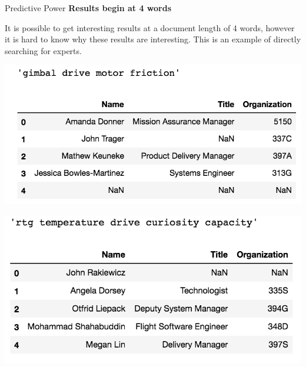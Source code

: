 \documentclass[10pt]{beamer}
\begin{document}
\begin{frame}{Predictive Power}
  {\bf Results begin at 4 words}

  It is possible to get interesting results at a document length of 4 words,
  however it is hard to know why these results are interesting.
  This is an example of directly searching for experts.

  \begin{multicols}{2}
    \includegraphics[width=\columnwidth]{query1.png}

    \includegraphics[width=\columnwidth]{query2.png}
  \end{multicols}


\end{frame}
\end{document}

